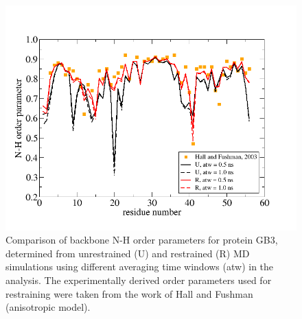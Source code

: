 \begin{figure}[H]
\centering
\includegraphics[scale=.3]{../04_tutorial_01/figures/GB3_S2}
\caption{Comparison of backbone N-H order parameters for protein GB3, determined from unrestrained (U) and restrained (R) MD simulations using different averaging time windows (atw) in the analysis. The experimentally derived order parameters used for restraining were taken from the work of Hall and Fushman ~\cite{Hall_2003} (anisotropic model).}
\label{GB3_S2}
\end{figure}








